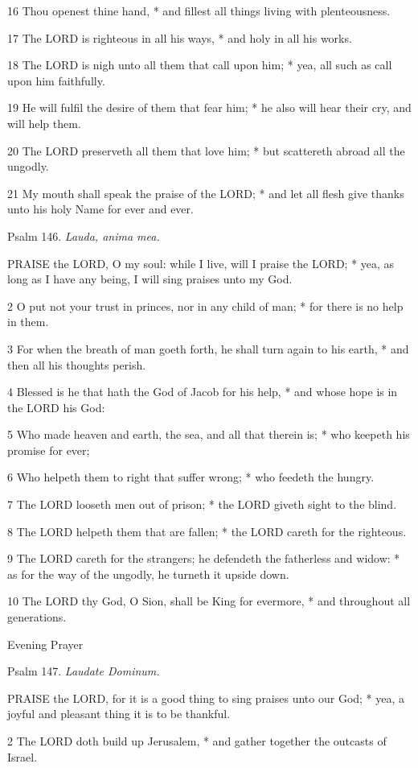 16 Thou openest thine hand, * and fillest all things
living with plenteousness.

17 The LORD is righteous in all his ways, * and holy
in all his works.

18 The LORD is nigh unto all them that call upon him;
* yea, all such as call upon him faithfully.

19 He will fulfil the desire of them that fear him;
* he also will hear their cry, and will help them.

20 The LORD preserveth all them that love him; * but
scattereth abroad all the ungodly.

21 My mouth shall speak the praise of the LORD; * and
let all flesh give thanks unto his holy Name for ever and ever.

Psalm
146. \emph{Lauda, anima mea.}

PRAISE
the LORD, O my soul: while I live, will I praise the LORD; * yea, as long
as I have any being, I will sing praises unto my God.

2 O put not your trust in princes, nor in any child
of man; * for there is no help in them.

3 For when the breath of man goeth forth, he shall
turn again to his earth, * and then all his thoughts perish.

4 Blessed is he that hath the God of Jacob for his
help, * and whose hope is in the LORD his God:

5 Who made heaven and earth, the sea, and all that
therein is; * who keepeth his promise for ever;

6 Who helpeth them to right that suffer wrong; * who
feedeth the hungry.

7 The LORD looseth men out of
prison; * the LORD giveth sight to the blind.

8 The LORD helpeth them that are fallen; * the LORD
careth for the righteous.

9 The LORD careth for the strangers; he defendeth the
fatherless and widow: * as for the way of the ungodly, he turneth it upside
down.

10 The LORD thy God, O Sion, shall be King for evermore,
* and throughout all generations. 

Evening
Prayer

Psalm
147. \emph{Laudate Dominum.}

PRAISE
the LORD, for it is a good thing to sing praises unto our God; * yea,
a joyful and pleasant thing it is to be thankful.

2 The LORD doth build up Jerusalem, * and gather together
the outcasts of Israel.

